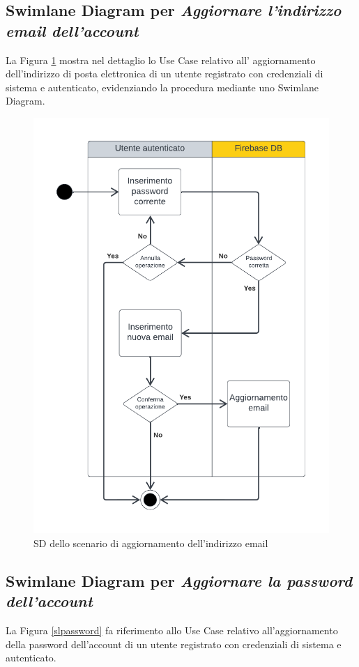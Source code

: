 \documentclass[11pt, a4paper]{article}
\theoremstyle{definition} %
\begin{document}
\subsection*{Swimlane Diagram per \textit{Aggiornare l'indirizzo email dell'account}}
La Figura \ref{slemail} mostra nel dettaglio lo Use Case relativo all' aggiornamento
dell'indirizzo di posta elettronica di un utente registrato con credenziali di sistema
e autenticato, evidenziando la procedura mediante uno Swimlane Diagram.
\begin{figure}[H]
\centering
\includegraphics[scale=0.65]{materiale/ucdiagrams/swimlaneemail.pdf}
\caption{SD dello scenario di aggiornamento dell'indirizzo email}
\label{slemail}
\end{figure}



\subsection*{Swimlane Diagram per \textit{Aggiornare la password dell'account}}
La Figura \ref{slpassword} fa riferimento allo Use Case relativo all'aggiornamento
della password dell'account di un utente registrato con credenziali di sistema e autenticato.
\end{document}

